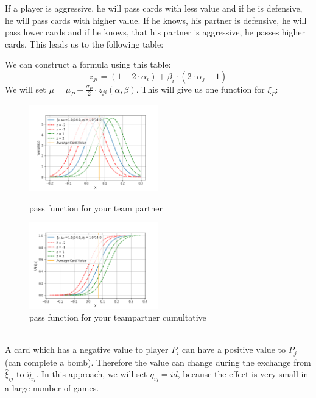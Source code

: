 If a player is aggressive, he will pass cards with less value and if he is defensive, he will pass cards with higher value. If he knows, his partner is defensive, he will pass lower cards and if he knows, that his partner is aggressive, he passes higher cards. This leads us to the following table:  \\
\begin{table}[h]
\caption{Table 2} \bigskip
\label{tab:my-table}
\end{table}
We can construct a formula using this table: 
\begin{equation*}
z_{ji} = (1 - 2\cdot\alpha_i) + \beta_i \cdot (2\cdot\alpha_j - 1)
\end{equation*}
We will set $\mu = \mu_P + \frac{\sigma_P}{2} \cdot z_{ji}(\alpha, \beta)$. This will give us one function for $\xi_P$:
\begin{figure}[h]
    \centering
    \includegraphics[width=0.5\textwidth]{Bilder/pass_function_p}
    \caption{pass function for your team partner}
    \label{fig:meine-grafik}
    \centering
    \includegraphics[width=0.5\textwidth]{Bilder/pass_function_p_cumultative}
    \caption{pass function for your teampartner cumultative}
    \label{fig:meine-grafik}
\end{figure}
\\
A card which has a negative value to player $P_i$ can have a positive value to $P_j$ (can complete a bomb). Therefore the value can change during the exchange from $\hat{\xi}_{ij}$ to $\hat{\eta}_{ij}$. In this approach, we will set $\eta_{ij} = id$, because the effect is very small in a large number of games. 

